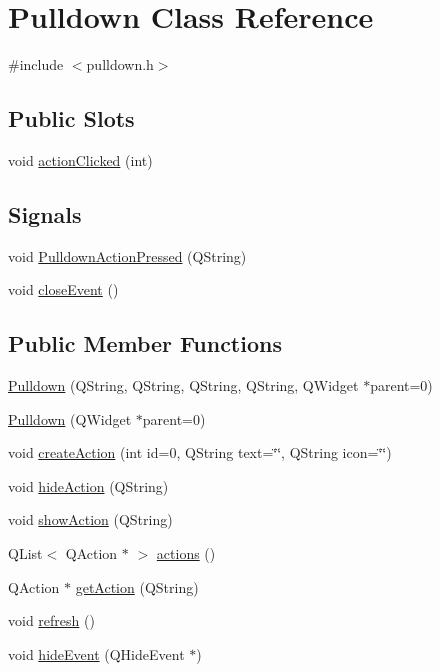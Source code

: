 \hypertarget{classPulldown}{
\section{Pulldown Class Reference}
\label{classPulldown}
}


{\ttfamily \#include $<$pulldown.h$>$}

\subsection*{Public Slots}
\begin{DoxyCompactItemize}
\item 
void \hyperlink{classPulldown_a16b0f7c311015cd850ba6df9e4fb64ea}{actionClicked} (int)
\end{DoxyCompactItemize}
\subsection*{Signals}
\begin{DoxyCompactItemize}
\item 
void \hyperlink{classPulldown_af3b9bba6285a333790916e68507bf736}{PulldownActionPressed} (QString)
\item 
void \hyperlink{classPulldown_a74abcbec6196edfe4a4fa85e32d882c0}{closeEvent} ()
\end{DoxyCompactItemize}
\subsection*{Public Member Functions}
\begin{DoxyCompactItemize}
\item 
\hyperlink{classPulldown_a877a1bbe993a2c4db4de0032a1390b01}{Pulldown} (QString, QString, QString, QString, QWidget $\ast$parent=0)
\item 
\hyperlink{classPulldown_ac13c98e9829756be08c13e79328697b0}{Pulldown} (QWidget $\ast$parent=0)
\item 
void \hyperlink{classPulldown_aadb9f61c88f11bf2701cac144f358014}{createAction} (int id=0, QString text=\char`\"{}\char`\"{}, QString icon=\char`\"{}\char`\"{})
\item 
void \hyperlink{classPulldown_aa1d33daa01ef053e3c37a8a17f147910}{hideAction} (QString)
\item 
void \hyperlink{classPulldown_a114fcb0f554e953c89848b1cea7262ba}{showAction} (QString)
\item 
QList$<$ QAction $\ast$ $>$ \hyperlink{classPulldown_a0226b93cdbcc9d02c9872e9f3abf700e}{actions} ()
\item 
QAction $\ast$ \hyperlink{classPulldown_a5e23742ee925a864e9cb8db5911dc93b}{getAction} (QString)
\item 
void \hyperlink{classPulldown_a26cd37f80074793419e026144bbfb417}{refresh} ()
\item 
void \hyperlink{classPulldown_a28773430dd853bcf30190a0a61febec5}{hideEvent} (QHideEvent $\ast$)
\end{DoxyCompactItemize}
